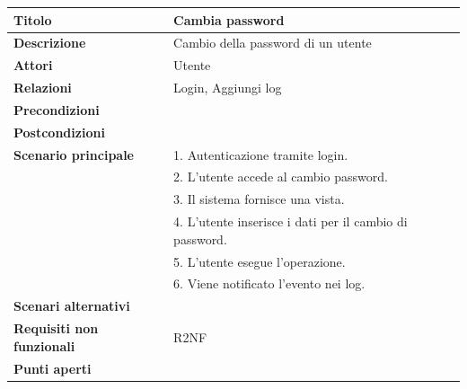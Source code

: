 \documentclass[a4paper]{article}
\begin{document}
\begin{table}[ht!]
  \begin{center}
    \begin{tabulary}{1\textwidth}{l|L}
        \textbf{Titolo} & Cambia password \\
        \hline
        \textbf{Descrizione} & Cambio della password di un utente \\
        \hline
        \textbf{Attori} & Utente \\
        \hline
        \textbf{Relazioni} & Login, Aggiungi log \\
        \hline
        \textbf{Precondizioni} &  \\
        \hline
        \textbf{Postcondizioni} &  \\
        \hline
        \textbf{Scenario principale} & 1. Autenticazione tramite login. \\
                                     & 2. L'utente accede al cambio password. \\
                                     & 3. Il sistema fornisce una vista. \\
                                     & 4. L'utente inserisce i dati per il cambio di password. \\
                                     & 5. L'utente esegue l'operazione.\\
                                     & 6. Viene notificato l'evento nei log.\\
        \hline
        \textbf{Scenari alternativi} & \\
        \hline
        \textbf{Requisiti non funzionali} & R2NF \\
        \hline
        \textbf{Punti aperti} & \\
        \hline
    \end{tabulary}
  \end{center}
\end{table}
\end{document}
